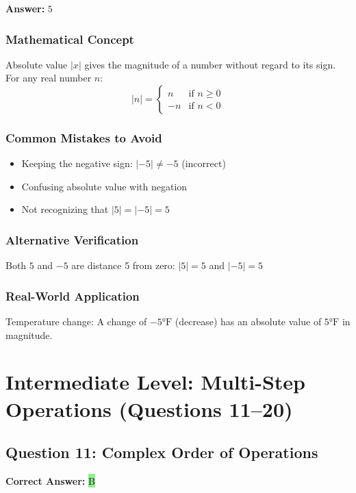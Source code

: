 \documentclass[12pt]{article}
\begin{document}
\textbf{Answer: } $5$

\subsubsection*{Mathematical Concept}
Absolute value $|x|$ gives the magnitude of a number without regard to its sign. For any real number $n$:
\[
|n| = \begin{cases} n & \text{if } n \geq 0 \\ -n & \text{if } n < 0 \end{cases}
\]

\subsubsection*{Common Mistakes to Avoid}
\begin{itemize}
\item Keeping the negative sign: $|-5| \neq -5$ (incorrect)
\item Confusing absolute value with negation
\item Not recognizing that $|5| = |-5| = 5$
\end{itemize}

\subsubsection*{Alternative Verification}
Both $5$ and $-5$ are distance 5 from zero: $|5| = 5$ and $|-5| = 5$ 

\subsubsection*{Real-World Application}
Temperature change: A change of $-5°\text{F}$ (decrease) has an absolute value of $5°\text{F}$ in magnitude.

\newpage

\section{Intermediate Level: Multi-Step Operations (Questions 11--20)}

\subsection{Question 11: Complex Order of Operations}

\textbf{Correct Answer: } \colorbox{lightgreen}{B}
\end{document}
